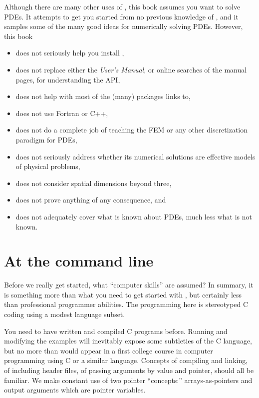 Although there are many other uses of \PETSc, this book assumes you want to solve PDEs.  It attempts to get you started from no previous knowledge of \PETSc, and it samples some of the many good ideas for numerically solving PDEs.  However, this book\begin{itemize}
\item  does not seriously help you install \PETSc,
\item  does not replace either the \PETSc \emph{User's Manual}, or online searches of the \PETSc manual pages, for understanding the API,
\item  does not help with most of the (many) packages \PETSc links to,
\item  does not use Fortran or C++,
\item  does not do a complete job of teaching the FEM or any other discretization paradigm for PDEs,
\item  does not seriously address whether its numerical solutions are effective models of physical problems,
\item  does not consider spatial dimensions beyond three,
\item  does not prove anything of any consequence, and
\item  does not adequately cover what is known about PDEs, much less what is not known.
\end{itemize}


\section{At the command line}

Before we really get started, what ``computer skills'' are assumed?  In summary, it is something more than what you need to get started with \Matlab, but certainly less than professional programmer abilities.  The programming here is stereotyped C coding using a modest language subset.

You need to have written and compiled C programs before.   Running and modifying the examples will inevitably expose some subtleties of the C language, but no more than would appear in a first college course in computer programming using C or a similar language.  Concepts of compiling and linking, of including header files, of passing arguments by value and pointer, should all be familiar.  We make constant use of two pointer ``concepts:'' arrays-as-pointers and output arguments which are pointer variables.

